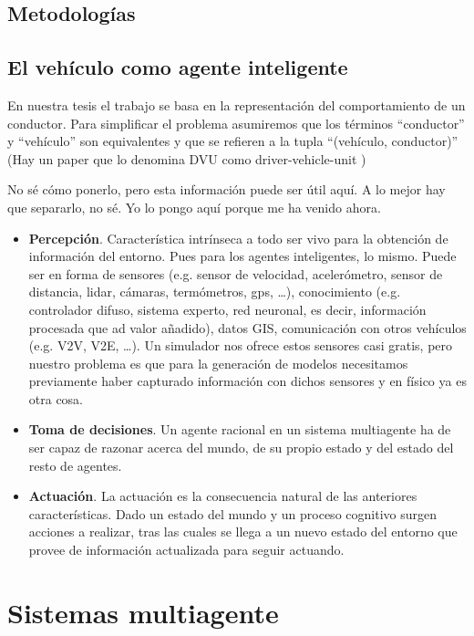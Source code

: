 \subsection{Metodologías}

\subsection{El vehículo como agente inteligente}

En nuestra tesis el trabajo se basa en la representación del comportamiento de un conductor. Para simplificar el problema asumiremos que los términos \enquote{conductor} y \enquote{vehículo} son equivalentes y que se refieren a la tupla \enquote{(vehículo, conductor)} (Hay un paper que lo denomina DVU como driver-vehicle-unit \cite{Dia2002})

No sé cómo ponerlo, pero esta información puede ser útil aquí. A lo mejor hay que separarlo, no sé. Yo lo pongo aquí porque me ha venido ahora.

\begin{itemize}
	\item \textbf{Percepción}. Característica intrínseca a todo ser vivo para la obtención de información del entorno. Pues para los agentes inteligentes, lo mismo. Puede ser en forma de sensores (e.g. sensor de velocidad, acelerómetro, sensor de distancia, lidar, cámaras, termómetros, gps, \ldots), conocimiento (e.g. controlador difuso, sistema experto, red neuronal, es decir, información procesada que ad valor añadido), datos GIS, comunicación con otros vehículos (e.g. V2V, V2E, \ldots). Un simulador nos ofrece estos sensores casi gratis, pero nuestro problema es que para la generación de modelos necesitamos previamente haber capturado información con dichos sensores y en físico ya es otra cosa.
	\item \textbf{Toma de decisiones}. Un agente racional en un sistema multiagente ha de ser capaz de razonar acerca del mundo, de su propio estado y del estado del resto de agentes.
	\item \textbf{Actuación}. La actuación es la consecuencia natural de las anteriores características. Dado un estado del mundo y un proceso cognitivo surgen acciones a realizar, tras las cuales se llega a un nuevo estado del entorno que provee de información actualizada para seguir actuando.
\end{itemize}

\section{Sistemas multiagente}

